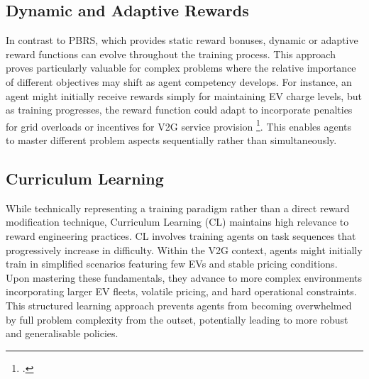 \subsection{Dynamic and Adaptive Rewards}

In contrast to PBRS, which provides static reward bonuses, dynamic or adaptive reward functions can evolve throughout the training process. This approach proves particularly valuable for complex problems where the relative importance of different objectives may shift as agent competency develops. For instance, an agent might initially receive rewards simply for maintaining EV charge levels, but as training progresses, the reward function could adapt to incorporate penalties for grid overloads or incentives for V2G service provision \footcite{wan2022dynamic}. This enables agents to master different problem aspects sequentially rather than simultaneously.

\subsection{Curriculum Learning}

While technically representing a training paradigm rather than a direct reward modification technique, Curriculum Learning (CL) maintains high relevance to reward engineering practices. CL involves training agents on task sequences that progressively increase in difficulty. Within the V2G context, agents might initially train in simplified scenarios featuring few EVs and stable pricing conditions. Upon mastering these fundamentals, they advance to more complex environments incorporating larger EV fleets, volatile pricing, and hard operational constraints. This structured learning approach prevents agents from becoming overwhelmed by full problem complexity from the outset, potentially leading to more robust and generalisable policies.